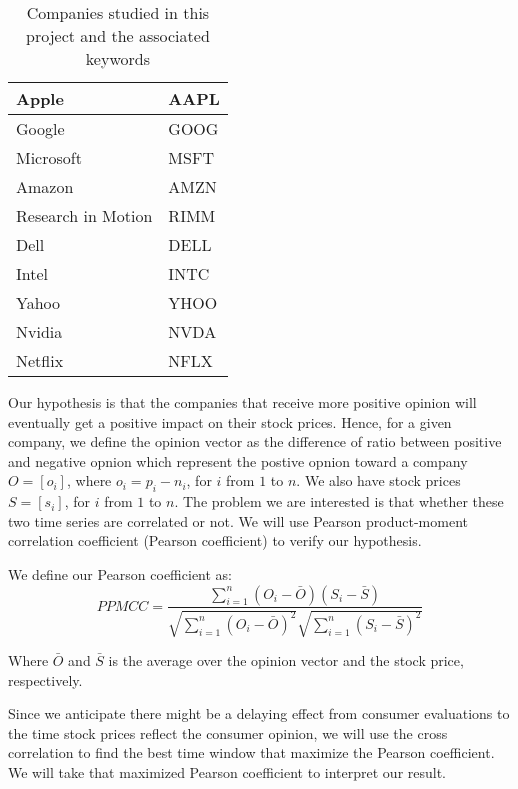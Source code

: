 \documentclass[12pt]{article}
\begin{document}
\begin{table}
\begin{center}
    \begin{tabular}{ | l || l | }
        \hline
        Apple &  AAPL \\ \hline
        Google & GOOG \\ \hline
        Microsoft & MSFT \\ \hline
        Amazon & AMZN \\ \hline
        Research in Motion & RIMM \\ \hline
        Dell & DELL \\ \hline
        Intel & INTC \\ \hline
        Yahoo & YHOO \\ \hline
        Nvidia & NVDA \\ \hline
        Netflix & NFLX \\
        \hline
    \end{tabular}
\caption{Companies studied in this project and the associated keywords}
\label{companies-symbols}
\end{center}
\end{table}

Our hypothesis is that the companies that receive more positive opinion will eventually get a positive impact on their stock prices. Hence, for a given company, we define the opinion vector as the difference of ratio between positive and negative opnion which represent the postive opnion toward a company $O = [o_i]$, where $o_i = p_i - n_i$, for $i$ from $1$ to $n$. We also have stock prices $S = [s_i]$, for $i$ from $1$ to $n$. The problem we are interested is that whether these two time series are correlated or not. We will use Pearson product-moment correlation coefficient (Pearson coefficient) to verify our hypothesis.

We define our Pearson coefficient as:
$$
PPMCC = \frac{\sum_{i=1}^{n}(O_i - \bar{O})(S_i - \bar{S})}{\sqrt{\sum_{i=1}^{n}(O_i - \bar{O})^2}\sqrt{\sum_{i=1}^{n}(S_i - \bar{S})^2}}
$$

Where $\bar{O}$ and $\bar{S}$ is the average over the opinion vector and the stock price, respectively.

Since we anticipate there might be a delaying effect from consumer evaluations to the time stock prices reflect the consumer opinion, we will use the cross correlation to find the best time window that maximize the Pearson coefficient. We will take that maximized Pearson coefficient to interpret our result.
\end{document}
